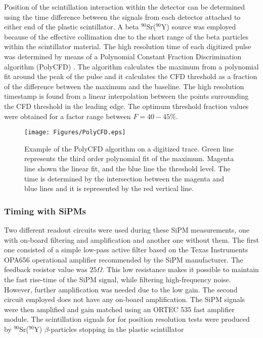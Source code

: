 Position of the scintillation interaction within the detector can be determined using the time difference between the signals from each detector attached to either end of the plastic scintillator. A beta $^{90}$Sr($^{90}$Y) source was employed because of the effective collimation due to the short range of the beta particles within the scintillator material. The high resolution time of each digitized pulse was determined by means of a Polynomial Constant Fraction Discrimination  algorithm (PolyCFD) \cite{PhDCory}. The algorithm calculates the maximum from a polynomial fit around the peak of the pulse and it calculates the CFD threshold as a fraction of the difference between the maximum and the baseline. The high resolution timestamp is found from a linear interpolation between the points surrounding the CFD threshold in the leading edge. The optimum threshold fraction values were obtained for a factor range between $F=40-45\%$.

\begin{figure}[hbt]
\centering
\texttt{[image: Figures/PolyCFD.eps]}
\caption{Example of the PolyCFD algorithm on a digitized trace. Green line represents the third order polynomial fit of the maximum. Magenta line shown the linear fit, and the blue line the threshold level. The time is determined by the intersection between the magenta and blue lines and it is represented by the red vertical line.}
\label{fig:PolyCFD}
\end{figure}

\subsubsection{Timing with SiPMs}
Two different readout circuits were used during these SiPM measurements, one with on-board  filtering and amplification and another one without them. The first one consisted of a simple low-pass active filter based on the Texas Instruments\textsuperscript{\textregistered} OPA656 operational amplifier recommended by the SiPM manufacturer. The feedback resistor value was $25\Omega$. This low resistance makes it possible to maintain the fast rise-time of the SiPM signal, while filtering high-frequency noise. However, further amplification was needed due to the low gain.  The second circuit employed does not have any on-board amplification. The SiPM signals were then amplified and gain matched using an ORTEC\textsuperscript{\textregistered} 535 fast amplifier module. The scintillation signals for for position resolution tests were produced by $^{90}$Sr($^{90}$Y) $\beta$-particles stopping in the plastic scintillator

